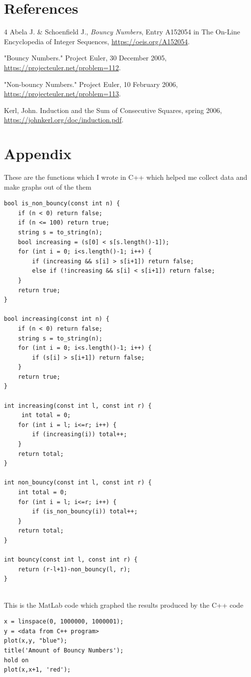\documentclass[titlepage,12pt]{article}
\begin{document}
\newpage

\section{References}

\begin{thebibliography}{4}
    Abela J. \& Schoenfield J., \textit{Bouncy Numbers}, Entry A152054 in The On-Line Encyclopedia of Integer Sequences, \url{https://oeis.org/A152054}.

    "Bouncy Numbers." Project Euler, 30 December 2005, \url{https://projecteuler.net/problem=112}.
    
    "Non-bouncy Numbers." Project Euler, 10 February 2006, \url{https://projecteuler.net/problem=113}.

    Kerl, John. Induction and the Sum of Consecutive Squares, spring 2006, \url{https://johnkerl.org/doc/induction.pdf}. 
\end{thebibliography}

\newpage

\section{Appendix}
These are the functions which I wrote in C++ which helped me collect data and make graphs out of the them
\begin{verbatim}
bool is_non_bouncy(const int n) {
    if (n < 0) return false;
    if (n <= 100) return true;
    string s = to_string(n);
    bool increasing = (s[0] < s[s.length()-1]);
    for (int i = 0; i<s.length()-1; i++) {
        if (increasing && s[i] > s[i+1]) return false;
        else if (!increasing && s[i] < s[i+1]) return false;
    }
    return true;
}

bool increasing(const int n) {
    if (n < 0) return false;
    string s = to_string(n);
    for (int i = 0; i<s.length()-1; i++) {
        if (s[i] > s[i+1]) return false;
    }
    return true;
}

int increasing(const int l, const int r) {
     int total = 0;
    for (int i = l; i<=r; i++) {
        if (increasing(i)) total++;
    }
    return total;
}

int non_bouncy(const int l, const int r) {
    int total = 0;
    for (int i = l; i<=r; i++) {
        if (is_non_bouncy(i)) total++;
    }
    return total;
}

int bouncy(const int l, const int r) {
    return (r-l+1)-non_bouncy(l, r);
}
\end{verbatim}
\noindent
\\
This is the MatLab code which graphed the results produced by the C++ code
\begin{verbatim}
x = linspace(0, 1000000, 1000001);
y = <data from C++ program>
plot(x,y, "blue");
title('Amount of Bouncy Numbers');
hold on
plot(x,x+1, 'red');
\end{verbatim}
\end{document}
